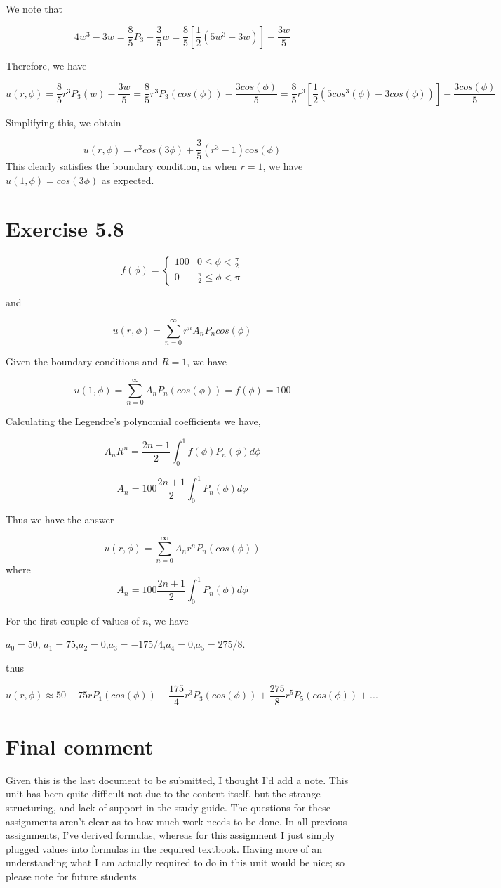 \documentclass{article}
\begin{document}
We note that

$$4w^3-3w = \frac{8}{5} P_3 - \frac{3}{5} w = \frac{8}{5} \left[ \frac{1}{2} \left(5w^3-3w\right)\right]-\frac{3w}{5}$$

Therefore, we have

$$u(r,\phi) = \frac{8}{5} r^3 P_3(w) - \frac{3w}{5} = \frac{8}{5} r^3 P_3(cos(\phi)) - \frac{3cos(\phi)}{5} = \frac{8}{5}r^3 \left[ \frac{1}{2} \left( 5cos^3(\phi)-3cos(\phi)\right)\right] - \frac{3cos(\phi)}{5}$$

Simplifying this, we obtain

$$u(r,\phi) = r^3cos(3\phi) + \frac{3}{5} (r^3-1) cos(\phi)$$
This clearly satisfies the boundary condition, as when $r=1$, we have $u(1,\phi) = cos(3\phi)$ as expected. 


\section*{Exercise 5.8}

\[ f(\phi) = \begin{cases}
      100 & 0\leq \phi < \frac{\pi}{2} \\
      0 & \frac{\pi}{2} \leq \phi < \pi
   \end{cases}
\]

and


$$u(r,\phi) = \sum_{n=0}^{\infty} r^n A_n P_n cos(\phi)$$

Given the boundary conditions and $R=1$, we have

$$u(1,\phi) = \sum_{n=0}^{\infty} A_n P_n(cos(\phi)) = f(\phi) = 100$$

Calculating the Legendre's polynomial coefficients we have,

$$A_nR^n = \frac{2n+1}{2} \int_0^{1} f(\phi) P_n(\phi) d\phi$$

$$A_n = 100 \frac{2n+1}{2} \int_0^{1} P_n(\phi) d\phi$$

Thus we have the answer

$$u(r,\phi) = \sum_{n=0}^{\infty} A_n r^n P_n(cos(\phi))$$
where
$$A_n = 100 \frac{2n+1}{2} \int_0^{1} P_n(\phi) d\phi$$

For the first couple of values of $n$, we have

$a_0 = 50$, $a_1 = 75$,$a_2 = 0$,$a_3 = -175/4$,$a_4 = 0$,$a_5 = 275/8$.
    
thus

$$u(r,\phi) \approx 50 + 75 r P_1(cos(\phi)) - \frac{175}{4} r^3 P_3(cos(\phi)) + \frac{275}{8} r^5 P_5(cos(\phi)) + ...$$

\section*{Final comment}
Given this is the last document to be submitted, I thought I'd add a note. This unit has been quite difficult not due to the content itself, but the strange structuring, and lack of support in the study guide. The questions for these assignments aren't clear as to how much work needs to be done. In all previous assignments, I've derived formulas, whereas for this assignment I just simply plugged values into formulas in the required textbook. Having more of an understanding what I am actually required to do in this unit would be nice; so please note for future students.
\end{document}
